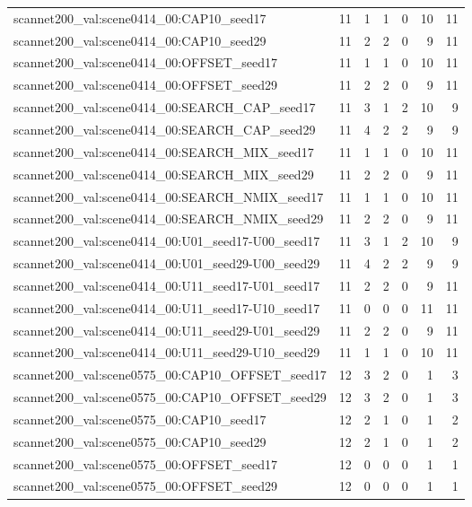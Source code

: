 \begin{table}[t]
\begin{tabular}{lrrrrrr}
scannet200\_val:scene0414\_00:CAP10\_seed17 & 11 & 1 & 1 & 0 & 10 & 11 \\
scannet200\_val:scene0414\_00:CAP10\_seed29 & 11 & 2 & 2 & 0 & 9 & 11 \\
scannet200\_val:scene0414\_00:OFFSET\_seed17 & 11 & 1 & 1 & 0 & 10 & 11 \\
scannet200\_val:scene0414\_00:OFFSET\_seed29 & 11 & 2 & 2 & 0 & 9 & 11 \\
scannet200\_val:scene0414\_00:SEARCH\_CAP\_seed17 & 11 & 3 & 1 & 2 & 10 & 9 \\
scannet200\_val:scene0414\_00:SEARCH\_CAP\_seed29 & 11 & 4 & 2 & 2 & 9 & 9 \\
scannet200\_val:scene0414\_00:SEARCH\_MIX\_seed17 & 11 & 1 & 1 & 0 & 10 & 11 \\
scannet200\_val:scene0414\_00:SEARCH\_MIX\_seed29 & 11 & 2 & 2 & 0 & 9 & 11 \\
scannet200\_val:scene0414\_00:SEARCH\_NMIX\_seed17 & 11 & 1 & 1 & 0 & 10 & 11 \\
scannet200\_val:scene0414\_00:SEARCH\_NMIX\_seed29 & 11 & 2 & 2 & 0 & 9 & 11 \\
scannet200\_val:scene0414\_00:U01\_seed17-U00\_seed17 & 11 & 3 & 1 & 2 & 10 & 9 \\
scannet200\_val:scene0414\_00:U01\_seed29-U00\_seed29 & 11 & 4 & 2 & 2 & 9 & 9 \\
scannet200\_val:scene0414\_00:U11\_seed17-U01\_seed17 & 11 & 2 & 2 & 0 & 9 & 11 \\
scannet200\_val:scene0414\_00:U11\_seed17-U10\_seed17 & 11 & 0 & 0 & 0 & 11 & 11 \\
scannet200\_val:scene0414\_00:U11\_seed29-U01\_seed29 & 11 & 2 & 2 & 0 & 9 & 11 \\
scannet200\_val:scene0414\_00:U11\_seed29-U10\_seed29 & 11 & 1 & 1 & 0 & 10 & 11 \\
scannet200\_val:scene0575\_00:CAP10\_OFFSET\_seed17 & 12 & 3 & 2 & 0 & 1 & 3 \\
scannet200\_val:scene0575\_00:CAP10\_OFFSET\_seed29 & 12 & 3 & 2 & 0 & 1 & 3 \\
scannet200\_val:scene0575\_00:CAP10\_seed17 & 12 & 2 & 1 & 0 & 1 & 2 \\
scannet200\_val:scene0575\_00:CAP10\_seed29 & 12 & 2 & 1 & 0 & 1 & 2 \\
scannet200\_val:scene0575\_00:OFFSET\_seed17 & 12 & 0 & 0 & 0 & 1 & 1 \\
scannet200\_val:scene0575\_00:OFFSET\_seed29 & 12 & 0 & 0 & 0 & 1 & 1 \\

\end{tabular}
\end{table}
